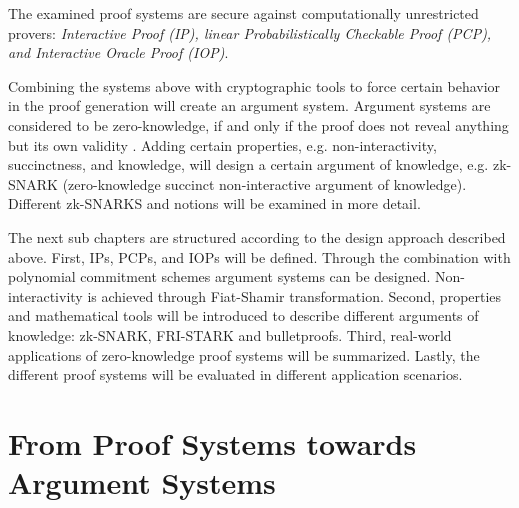 The examined proof systems are secure against computationally unrestricted provers: \textit{Interactive Proof (IP), linear Probabilistically Checkable Proof (PCP), and Interactive Oracle Proof (IOP)}. 

Combining the systems above with cryptographic tools to force certain behavior in the proof generation will create an argument system. Argument systems are considered to be zero-knowledge, if and only if the proof does not reveal anything but its own validity \citep{GoldwasserIPs}. Adding certain properties, e.g. non-interactivity, succinctness, and knowledge, will design a certain argument of knowledge, e.g. zk-SNARK (zero-knowledge succinct non-interactive argument of knowledge). Different zk-SNARKS and notions will be examined in more detail.

The next sub chapters are structured according to the design approach described above. First, IPs, PCPs, and IOPs will be defined. Through the combination with polynomial commitment schemes argument systems can be designed. Non-interactivity is achieved through Fiat-Shamir transformation. Second, properties and mathematical tools will be introduced to describe different arguments of knowledge: zk-SNARK, FRI-STARK and bulletproofs. Third, real-world applications of zero-knowledge proof systems will be summarized. Lastly, the different proof systems will be evaluated in different application scenarios.

\section{From Proof Systems towards Argument Systems}

